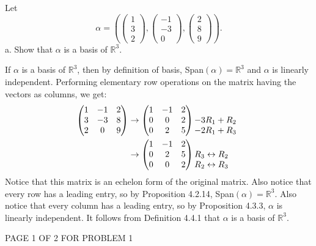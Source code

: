 \documentclass[12pt]{article}
\newenvironment{problem}[2][Problem]
{
	\begin{trivlist} 
		\item[\hskip \labelsep {\bfseries #1 #2:}]
	}
{
	\end{trivlist}
	}
\newenvironment{solution}[1][Solution]
{
	\begin{trivlist} 
		\item[\hskip \labelsep {\itshape #1:}]
	}
	{
	\end{trivlist}
}
\begin{document}
\begin{problem}{1}
Let
\[
\alpha = \left( \begin{pmatrix} 1\\3\\2 \end{pmatrix},\begin{pmatrix} -1\\-3\\0 \end{pmatrix}, \begin{pmatrix} 2\\8\\9 \end{pmatrix} \right)\text{.}
\]
\noindent
\newline
\newline
a. Show that $\alpha$ is a basis of $\mathbb{R}^3$.
\begin{solution}
If $\alpha$ is a basis of $\mathbb{R}^3$, then by definition of basis, Span$(\alpha)=\mathbb{R}^3$ and $\alpha$ is linearly independent. Performing elementary row operations on the matrix having the vectors as columns, we get:
\begin{align*}
\begin{pmatrix} 1&-1&2\\3&-3&8\\2&0&9 \end{pmatrix} & \rightarrow \begin{pmatrix} 1&-1&2\\0&0&2\\0&2&5 \end{pmatrix} \begin{matrix} \hphantom{1}\\ -3R_1 + R_2 \hphantom{1} \\ -2R_1+R_3\hphantom{1} \end{matrix}\\
& \rightarrow \begin{pmatrix} 1&-1&2\\0&2&5\\0&0&2 \end{pmatrix} \begin{matrix} \hphantom{1}\\ R_3 \leftrightarrow R_2  \hphantom{1} \\ R_2 \leftrightarrow R_3 \hphantom{1} \end{matrix}\\
\end{align*}
Notice that this matrix is an echelon form of the original matrix. Also notice that every row has a leading entry, so by Proposition 4.2.14, Span$(\alpha) = \mathbb{R}^3$. Also notice that every column has a leading entry, so by Proposition 4.3.3, $\alpha$ is linearly independent. It follows from Definition 4.4.1 that $\alpha$ is a basis of $\mathbb{R}^3$.
\end{solution}
\vfill
\centerline{PAGE 1 OF 2 FOR PROBLEM 1}
\end{problem}
\end{document}
